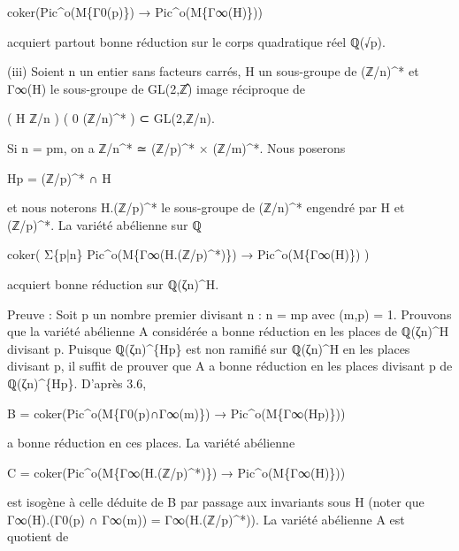 \documentclass[11pt,a4paper]{article}
\begin{document}
coker(Pic\textasciicircum{}o(M\textunderscore{}\{Γ\textunderscore{}0(p)\}) → Pic\textasciicircum{}o(M\textunderscore{}\{Γ\textunderscore{}∞(H)\}))

acquiert partout bonne réduction sur le corps quadratique réel ℚ(√p).

(iii) Soient n un entier sans facteurs carrés, H un sous-groupe de (ℤ/n)\textasciicircum{}* et Γ\textunderscore{}∞(H) le sous-groupe de GL(2,ℤ̂) image réciproque de

( H       ℤ/n ) ( 0   (ℤ/n)\textasciicircum{}* ) ⊂ GL(2,ℤ/n).

Si n = pm, on a ℤ/n\textasciicircum{}* ≃ (ℤ/p)\textasciicircum{}* × (ℤ/m)\textasciicircum{}*. Nous poserons

H\textunderscore{}p = (ℤ/p)\textasciicircum{}* ∩ H

et nous noterons H.(ℤ/p)\textasciicircum{}* le sous-groupe de (ℤ/n)\textasciicircum{}* engendré par H et (ℤ/p)\textasciicircum{}*. La variété abélienne sur ℚ

coker( Σ\textunderscore{}\{p|n\} Pic\textasciicircum{}o(M\textunderscore{}\{Γ\textunderscore{}∞(H.(ℤ/p)\textasciicircum{}*)\}) → Pic\textasciicircum{}o(M\textunderscore{}\{Γ\textunderscore{}∞(H)\}) )

acquiert bonne réduction sur ℚ(ζ\textunderscore{}n)\textasciicircum{}H.

Preuve : Soit p un nombre premier divisant n : n = mp avec (m,p) = 1. Prouvons que la variété abélienne A considérée a bonne réduction en les places de ℚ(ζ\textunderscore{}n)\textasciicircum{}H divisant p. Puisque ℚ(ζ\textunderscore{}n)\textasciicircum{}\{H\textunderscore{}p\} est non ramifié sur ℚ(ζ\textunderscore{}n)\textasciicircum{}H en les places divisant p, il suffit de prouver que A a bonne réduction en les places divisant p de ℚ(ζ\textunderscore{}n)\textasciicircum{}\{H\textunderscore{}p\}. D'après 3.6,

B = coker(Pic\textasciicircum{}o(M\textunderscore{}\{Γ\textunderscore{}0(p)∩Γ\textunderscore{}∞(m)\}) → Pic\textasciicircum{}o(M\textunderscore{}\{Γ\textunderscore{}∞(H\textunderscore{}p)\}))

a bonne réduction en ces places. La variété abélienne

C = coker(Pic\textasciicircum{}o(M\textunderscore{}\{Γ\textunderscore{}∞(H.(ℤ/p)\textasciicircum{}*)\}) → Pic\textasciicircum{}o(M\textunderscore{}\{Γ\textunderscore{}∞(H)\}))

est isogène à celle déduite de B par passage aux invariants sous H (noter que Γ\textunderscore{}∞(H).(Γ\textunderscore{}0(p) ∩ Γ\textunderscore{}∞(m)) = Γ\textunderscore{}∞(H.(ℤ/p)\textasciicircum{}*)). La variété abélienne A est quotient de
\end{document}
